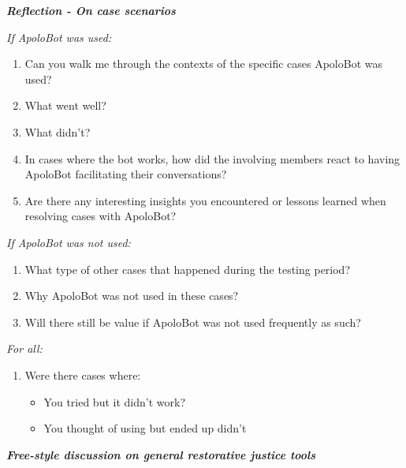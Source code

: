 \textbf{\textit{Reflection - On case scenarios}}

\textit{If ApoloBot was used:}

\begin{enumerate}
    \item Can you walk me through the contexts of the specific cases ApoloBot was used?
    \item What went well?
    \item What didn’t? 
    \item In cases where the bot works, how did the involving members react to having ApoloBot facilitating their conversations?
    \item Are there any interesting insights you encountered or lessons learned when resolving cases with ApoloBot?
\end{enumerate}

\textit{If ApoloBot was not used:}
\begin{enumerate}
    \item What type of other cases that happened during the testing period? 
    \item Why ApoloBot was not used in these cases?
    \item Will there still be value if ApoloBot was not used frequently as such?
\end{enumerate}

\textit{For all:}

\begin{enumerate}
    \item Were there cases where:
    \begin{itemize}
        \item You tried but it didn’t work?
        \item You thought of using but ended up didn’t
    \end{itemize}
\end{enumerate}

\textbf{\textit{Free-style discussion on general restorative justice tools}}

%
